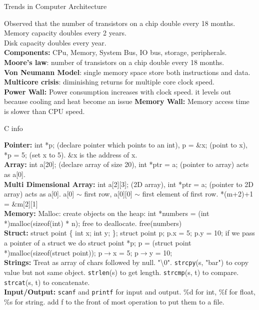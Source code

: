 \documentclass[answers,12pt,addpoints]{exam}
\author{\name}
\begin{document}
\begin{center}
    Trends in Computer Architecture
\end{center}
Observed that the number of transistors on a chip double every 18 months. \\
Memory capacity doubles every 2 years. \\
Disk capacity doubles every year. \\
\textbf{Components:} CPu, Memory, System Bus, IO bus, storage, peripherals. \\
\textbf{Moore's law}: number of transistors on a chip double every 18 months. \\
\textbf{Von Neumann Model}: single memory space store both instructions and data. \\
\textbf{Multicore crisis}: diminishing returns for multiple core clock speed.\\
\textbf{Power Wall:} Power consumption increases with clock speed. it levels out because cooling and heat become an issue
\textbf{Memory Wall:} Memory access time is slower than CPU speed. 
\begin{center}
    C info
\end{center}
\textbf{Pointer:}  int *p; (declare pointer which points to an int), p = \&x; (point to x), *p = 5; (set x to 5). \&x is the address of x. \\
\textbf{Array:} int a[20]; (declare array of size 20), int *ptr = a; (pointer to array) acts as a[0]. \\
\textbf{Multi Dimensional Array:} int a[2][3]; (2D array), int *ptr = a; (pointer to 2D array) acts as a[0]. a[0] $\sim$ first row, a[0][0] $\sim$ first element of first row. *(m+2)+1 = \&m[2][1]\\
\textbf{Memory:} Malloc: create objects on the heap: int *numbers = (int *)malloc(sizeof(int) * n); free to deallocate. free(numbers) \\
\textbf{Struct:} struct point \{ int x; int y; \}; struct point p; p.x = 5; p.y = 10; if we pass a pointer of a struct we do struct point *p; p = (struct point *)malloc(sizeof(struct point)); p$\to$x = 5; p$\to$y = 10; \\
\textbf{Strings:} Treat as array of chars followed by null. "\textbackslash 0". \texttt{strcpy}(s, "bar") to copy value but not same object. \texttt{strlen}(s) to get length. \texttt{strcmp}(s, t) to compare. \texttt{strcat}(s, t) to concatenate.\\
\textbf{Input/Output:} \texttt{scanf} and \texttt{printf} for input and output. \%d for int, \%f for float, \%s for string. add f to the front of most operation to put them to a file. 
\end{document}
